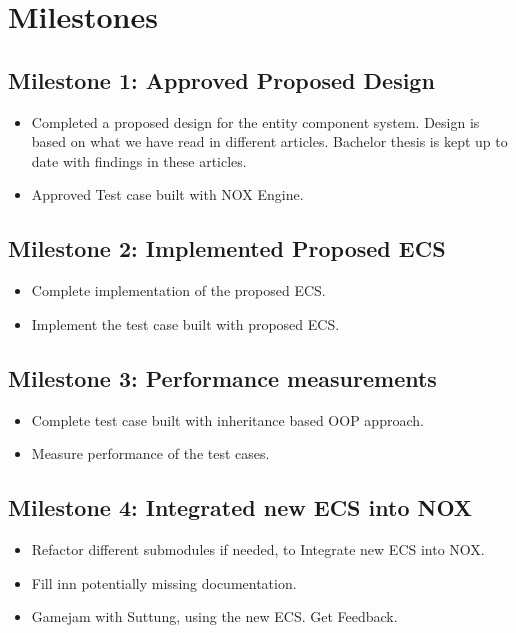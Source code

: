 \section*{Milestones}

\subsection*{Milestone 1: Approved Proposed Design}
\begin{itemize}
    \item
        Completed a proposed design for the entity component system. 
        Design is based on what we have read in different articles.
        Bachelor thesis is kept up to date with findings 
        in these articles.

    \item
        Approved Test case built with NOX Engine. 
\end{itemize}

\subsection*{Milestone 2: Implemented Proposed ECS}
\begin{itemize}
    \item
        Complete implementation of the proposed ECS.
    \item
        Implement the test case built with proposed ECS.

\end{itemize}

\subsection*{Milestone 3: Performance measurements}
\begin{itemize}
    \item
        Complete test case built with inheritance based OOP approach.

    \item
        Measure performance of the test cases.

\end{itemize}

\subsection*{Milestone 4: Integrated new ECS into NOX}
\begin{itemize}
    \item
        Refactor different submodules if needed,
        to Integrate new ECS into NOX.

    \item
        Fill inn potentially missing documentation.

    \item
        Gamejam with Suttung, using the new ECS. 
        Get Feedback. 
\end{itemize}